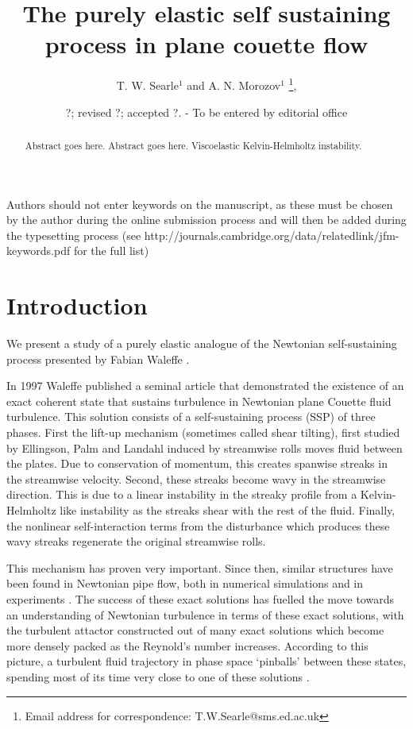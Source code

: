 \documentclass{jfm}
\title[The purely elastic self sustaining process in plane couette flow]{The purely elastic self sustaining process in plane couette flow}
\author[T. W. Searle and A. N. Morozov]%
{T. W. Searle$^1$ and A. N. Morozov$^1$%
  \thanks{Email address for correspondence: T.W.Searle@sms.ed.ac.uk},\ns
}
\affiliation{$^1$SUPA, School of Physics and Astronomy, University of Edinburgh, Mayfield Road,
Edinburgh, EH9 3JZ, UK\\[\affilskip]
}
\date{?; revised ?; accepted ?. - To be entered by editorial office}
\begin{document}
\maketitle

\begin{abstract}
  Abstract goes here. Abstract goes here. Viscoelastic Kelvin-Helmholtz instability. 
\end{abstract}

\begin{keywords}
Authors should not enter keywords on the manuscript, as these must be chosen by the author during the online submission process and will then be added during the typesetting process (see http://journals.cambridge.org/data/\linebreak[3]relatedlink/jfm-\linebreak[3]keywords.pdf for the full list)
\end{keywords}

\section{Introduction}\label{sec:intro}

We present a study of a purely elastic analogue of the Newtonian self-sustaining process presented by Fabian Waleffe \cite{Waleffe1997}.

In 1997 Waleffe published a seminal article that demonstrated the existence of an exact coherent state that sustains turbulence in Newtonian plane Couette fluid turbulence. This solution consists of a self-sustaining process (SSP) of three phases. First the lift-up mechanism (sometimes called shear tilting), first studied by Ellingson, Palm and Landahl \cite{Ellingson1970, Landahl1980} induced by streamwise rolls moves fluid between the plates. Due to conservation of momentum, this creates spanwise streaks in the streamwise velocity. Second, these streaks become wavy in the streamwise direction. This is due to a linear instability in the streaky profile from a Kelvin-Helmholtz like instability as the streaks shear with the rest of the fluid. Finally, the nonlinear self-interaction terms from the disturbance which produces these wavy streaks regenerate the original streamwise rolls.

This mechanism has proven very important. Since then, similar structures have been found in Newtonian pipe flow, both in numerical simulations \cite{PIPEECS} and in experiments \cite{PIPEECSEXP}. The success of these exact solutions has fuelled the move towards an understanding of Newtonian turbulence in terms of these exact solutions, with the turbulent attactor constructed out of many exact solutions which become more densely packed as the Reynold's number increases. According to this picture, a turbulent fluid trajectory in phase space `pinballs' between these states, spending most of its time very close to one of these solutions \cite{NOIDEA}.
\end{document}
